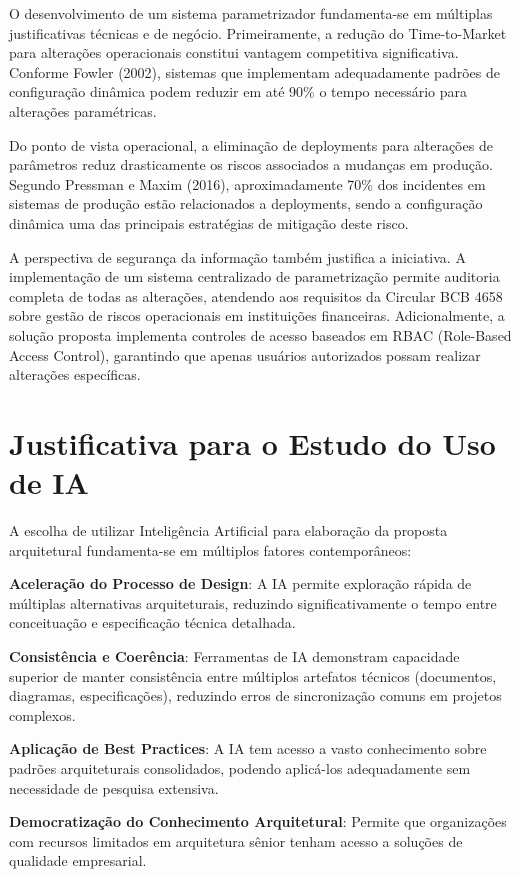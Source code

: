 O desenvolvimento de um sistema parametrizador fundamenta-se em múltiplas justificativas técnicas e de negócio. Primeiramente, a redução do Time-to-Market para alterações operacionais constitui vantagem competitiva significativa. Conforme Fowler (2002), sistemas que implementam adequadamente padrões de configuração dinâmica podem reduzir em até 90\% o tempo necessário para alterações paramétricas.

Do ponto de vista operacional, a eliminação de deployments para alterações de parâmetros reduz drasticamente os riscos associados a mudanças em produção. Segundo Pressman e Maxim (2016), aproximadamente 70\% dos incidentes em sistemas de produção estão relacionados a deployments, sendo a configuração dinâmica uma das principais estratégias de mitigação deste risco.

A perspectiva de segurança da informação também justifica a iniciativa. A implementação de um sistema centralizado de parametrização permite auditoria completa de todas as alterações, atendendo aos requisitos da Circular BCB 4658 sobre gestão de riscos operacionais em instituições financeiras. Adicionalmente, a solução proposta implementa controles de acesso baseados em RBAC (Role-Based Access Control), garantindo que apenas usuários autorizados possam realizar alterações específicas.

\section{Justificativa para o Estudo do Uso de IA}

A escolha de utilizar Inteligência Artificial para elaboração da proposta arquitetural fundamenta-se em múltiplos fatores contemporâneos:

\textbf{Aceleração do Processo de Design}: A IA permite exploração rápida de múltiplas alternativas arquiteturais, reduzindo significativamente o tempo entre conceituação e especificação técnica detalhada.

\textbf{Consistência e Coerência}: Ferramentas de IA demonstram capacidade superior de manter consistência entre múltiplos artefatos técnicos (documentos, diagramas, especificações), reduzindo erros de sincronização comuns em projetos complexos.

\textbf{Aplicação de Best Practices}: A IA tem acesso a vasto conhecimento sobre padrões arquiteturais consolidados, podendo aplicá-los adequadamente sem necessidade de pesquisa extensiva.

\textbf{Democratização do Conhecimento Arquitetural}: Permite que organizações com recursos limitados em arquitetura sênior tenham acesso a soluções de qualidade empresarial.

